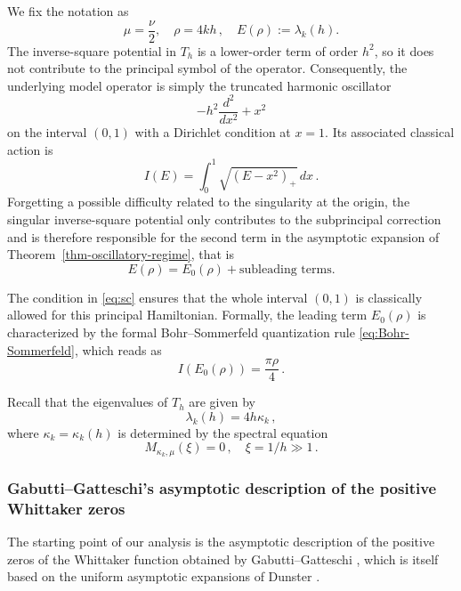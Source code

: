 \documentclass[11pt]{amsart}
\numberwithin{equation}{section}
\theoremstyle{remark}
\newcommand{\mn}{\medskip\noindent}
\newcommand{\action}{I}
\begin{document}
We fix the notation as
\begin{equation}\label{eq:sc-notation}
\mu=\frac{\nu}{2},\quad \rho=4kh\,,\quad E(\rho):=\lambda_k(h).
\end{equation}
The inverse-square potential in $T_h$ is a lower-order term of order
$h^2$, so it does not contribute to the principal symbol of the
operator.
Consequently, the
underlying model operator is simply the truncated harmonic oscillator
\begin{equation}
-h^2\frac{d^2}{dx^2}+x^2
\end{equation}
on the interval \((0,1)\) with a Dirichlet condition at \(x=1\). Its  associated classical action is
\begin{equation}\label{eq:action}
\action(E)=\int_0^1\sqrt{(E-x^2)_+}\,dx\,.
\end{equation}
%
Forgetting a possible difficulty related to the singularity at the origin, the
singular inverse-square potential only contributes to the
subprincipal correction and is therefore responsible for the second
term in the asymptotic expansion of Theorem~\ref{thm-oscillatory-regime}, that is
\[E(\rho)=E_0(\rho)+\text{subleading terms}.\]

\mn
The condition in \eqref{eq:sc} ensures that the whole interval \((0,1)\) is classically allowed for this
principal Hamiltonian. 
Formally, the leading term \(E_0(\rho)\)  is characterized by the formal
Bohr--Sommerfeld quantization rule \eqref{eq:Bohr-Sommerfeld}, which reads as
\[
\action(E_0(\rho))
=
\frac{\pi\rho}{4}\,.\]


\mn Recall that the eigenvalues of $T_h$ are given by
\begin{equation}\label{lambda-kappa}
\lambda_k(h)=4h \kappa_k\,,
\end{equation}
%
where $\kappa_k=\kappa_k(h)$ is determined by the spectral equation
\begin{equation}\label{spectral-kappa}
M_{\kappa_k,\mu}(\xi)=0\,,\quad \xi=1/h\gg 1\,.
\end{equation}

\subsubsection{Gabutti--Gatteschi's asymptotic description of the
positive Whittaker zeros}

The starting point of our analysis is the asymptotic description of the
positive zeros of the Whittaker function obtained by
Gabutti--Gatteschi \cite[Theorems~2.1 and~2.3]{GG2001}, which is itself
based on the uniform asymptotic expansions of Dunster
\cite{Dunster}.
\end{document}
